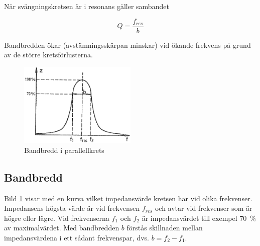 När svängningskretsen är i resonans gäller sambandet

\[Q = \frac{f_{res}}{b}\]

Bandbredden ökar (avstämningsskärpan minskar) vid ökande frekvens på grund av de
större kretsförlusterna.

\begin{figure}
\includegraphics[width=0.5\textwidth]{images/cropped_pdfs/bild_2_3-21.pdf}
\caption{Bandbredd i parallellkrets}
\label{fig:BildII3-21}
\end{figure}

\subsection{Bandbredd}

Bild \ref{fig:BildII3-21} visar med en kurva vilket impedansvärde kretsen har
vid olika frekvenser.
Impedansens högsta värde är vid frekvensen \(f_{res}\) och avtar vid frekvenser
som är högre eller lägre.
Vid frekvenserna \(f_1\) och \(f_2\) är impedansvärdet till exempel 70~\% av
maximalvärdet.
Med bandbredden \(b\) förstås skillnaden mellan impedansvärdena i ett sådant
frekvenspar, dvs. \(b = f_2 - f_1\).
